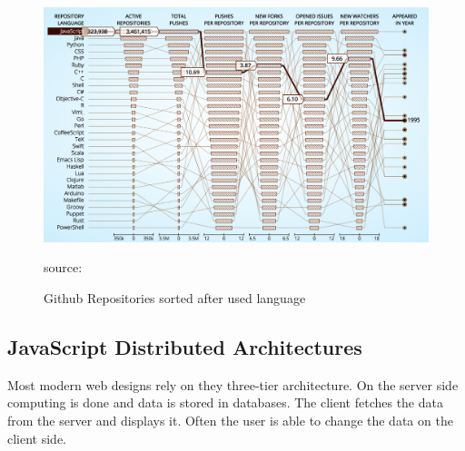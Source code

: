 \begin{figure}[hb]
	\centering
	\includegraphics[scale=0.5]{bilder/grundlagen/jsUsage.png}
	\caption{Github Repositories sorted after used language} source:\cite{JS}
	\label{fig:JS}
\end{figure}

\newpage

\subsection{JavaScript Distributed Architectures}
Most modern web designs rely on they three-tier architecture. On the server side computing is done and data is stored in databases. The client fetches the data from the server and displays it. Often the user is able to change the data on the client side. 

